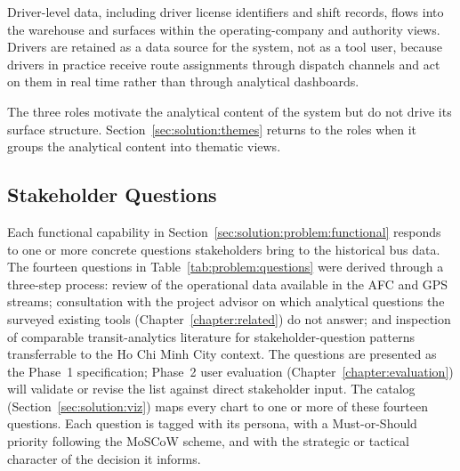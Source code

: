Driver-level data, including driver license identifiers and shift
records, flows into the warehouse and surfaces within the operating-company
and authority views. Drivers are retained as a data source for the
system, not as a tool user, because drivers in practice receive route
assignments through dispatch channels and act on them in real time
rather than through analytical dashboards.

The three roles motivate the analytical content of the system but do not
drive its surface structure. Section~\ref{sec:solution:themes} returns to the
roles when it groups the analytical content into thematic views.

\subsection{Stakeholder Questions}
\label{sec:solution:problem:questions}

Each functional capability in Section~\ref{sec:solution:problem:functional}
responds to one or more concrete questions stakeholders bring to the
historical bus data. The fourteen questions in
Table~\ref{tab:problem:questions} were derived through a three-step
process: review of the operational data available in the AFC and GPS
streams; consultation with the project advisor on which analytical
questions the surveyed existing tools (Chapter~\ref{chapter:related})
do not answer; and inspection of comparable transit-analytics literature
for stakeholder-question patterns transferrable to the Ho Chi Minh City
context. The questions are presented as the Phase~1 specification; Phase~2
user evaluation (Chapter~\ref{chapter:evaluation}) will validate or revise
the list against direct stakeholder input. The catalog
(Section~\ref{sec:solution:viz}) maps every chart to one or more of
these fourteen questions. Each question is tagged with its persona, with a Must-or-Should
priority following the MoSCoW scheme, and with the strategic or tactical
character of the decision it informs.

